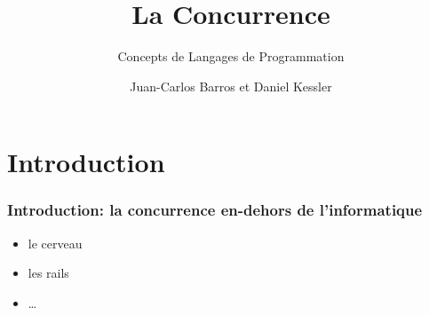 \documentclass{beamer}
\title{La Concurrence}
\subtitle{Concepts de Langages de Programmation}
\author{Juan-Carlos Barros et Daniel Kessler}
\begin{document}
\begin{frame}
  \titlepage
\end{frame}

\begin{frame}
  \tableofcontents
\end{frame}

\section{Introduction}
\begin{frame}
  \frametitle{Introduction: la concurrence en-dehors de l'informatique}
  \begin{itemize}
  \item le cerveau
  \item les rails
  \item \ldots
  \end{itemize}
\end{frame}
\end{document}
